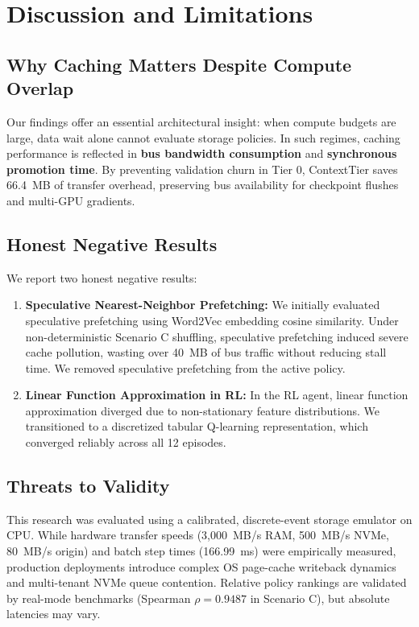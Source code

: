 \documentclass[conference]{IEEEtran}
\begin{document}
\section{Discussion and Limitations}
\label{sec:discussion}

\subsection{Why Caching Matters Despite Compute Overlap}
Our findings offer an essential architectural insight: when compute budgets are large, data wait alone cannot evaluate storage policies. In such regimes, caching performance is reflected in \textbf{bus bandwidth consumption} and \textbf{synchronous promotion time}. By preventing validation churn in Tier 0, ContextTier saves 66.4~MB of transfer overhead, preserving bus availability for checkpoint flushes and multi-GPU gradients.

\subsection{Honest Negative Results}
We report two honest negative results:
\begin{enumerate}
    \item \textbf{Speculative Nearest-Neighbor Prefetching:} We initially evaluated speculative prefetching using Word2Vec embedding cosine similarity. Under non-deterministic Scenario C shuffling, speculative prefetching induced severe cache pollution, wasting over 40~MB of bus traffic without reducing stall time. We removed speculative prefetching from the active policy.
    \item \textbf{Linear Function Approximation in RL:} In the RL agent, linear function approximation diverged due to non-stationary feature distributions. We transitioned to a discretized tabular Q-learning representation, which converged reliably across all 12 episodes.
\end{enumerate}

\subsection{Threats to Validity}
This research was evaluated using a calibrated, discrete-event storage emulator on CPU. While hardware transfer speeds (3,000~MB/s RAM, 500~MB/s NVMe, 80~MB/s origin) and batch step times (166.99~ms) were empirically measured, production deployments introduce complex OS page-cache writeback dynamics and multi-tenant NVMe queue contention. Relative policy rankings are validated by real-mode benchmarks (Spearman $\rho = 0.9487$ in Scenario C), but absolute latencies may vary.
\end{document}
